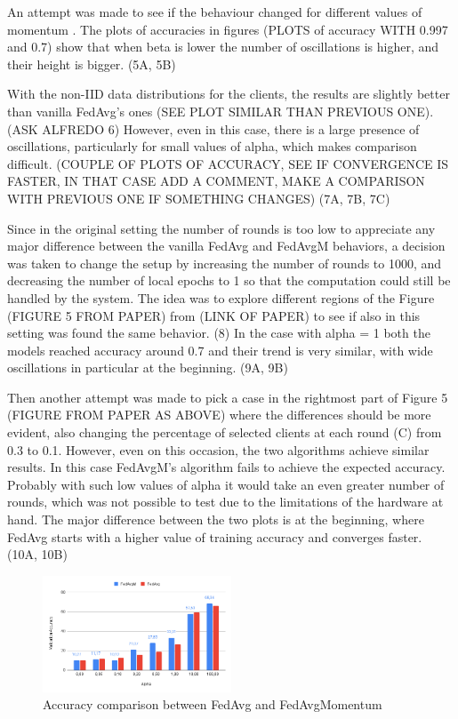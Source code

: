 \documentclass[twocolumn]{article}
\begin{document}
An attempt was made to see if the behaviour changed for different values of momentum . The plots of accuracies in figures (PLOTS of accuracy WITH 0.997 and 0.7) show that when beta is lower the number of oscillations is higher, and their height is bigger.
(5A, 5B)

With the non-IID data distributions for the clients, the results are slightly better than vanilla FedAvg's ones (SEE PLOT SIMILAR THAN PREVIOUS ONE). 
(ASK ALFREDO 6)
However, even in this case, there is a large presence of oscillations, particularly for small values of alpha, which makes comparison difficult.
(COUPLE OF PLOTS OF ACCURACY, SEE IF CONVERGENCE IS FASTER, IN THAT CASE ADD A COMMENT, MAKE A COMPARISON WITH PREVIOUS ONE IF SOMETHING CHANGES)
(7A, 7B, 7C)

Since in the original setting the number of rounds is too low to appreciate any major difference between the vanilla FedAvg and FedAvgM behaviors, a decision was taken to change the setup by increasing the number of rounds to 1000, and decreasing the number of local epochs to 1 so that the computation could still be handled by the system.
The idea was to explore different regions of the Figure (FIGURE 5 FROM PAPER) from (LINK OF PAPER) to see if also in this setting was found the same behavior.
(8)
In the case with alpha = 1 both the models reached accuracy around 0.7 and their trend is very similar, with wide oscillations in particular at the beginning.
(9A, 9B)

Then another attempt was made to pick a case in the rightmost part of Figure 5 (FIGURE FROM PAPER AS ABOVE) where the differences should be more evident, also changing the percentage of selected clients at each round (C) from 0.3 to 0.1. 
However, even on this occasion, the two algorithms achieve similar results. In this case FedAvgM's algorithm fails to achieve the expected accuracy. Probably with such low values of alpha it would take an even greater number of rounds, which was not possible to test due to the limitations of the hardware at hand. The major difference between the two plots is at the beginning, where FedAvg starts with a higher value of training accuracy and converges faster.
(10A, 10B)


\begin{figure}
    \centering
    \includegraphics[width=0.5\textwidth,height=.3\textheight]{FedAvgMvsFedAvg.png}
    \caption{Accuracy comparison between FedAvg and FedAvgMomentum}
    \label{FedAvgvsFedM} 
\end{figure}
\end{document}

